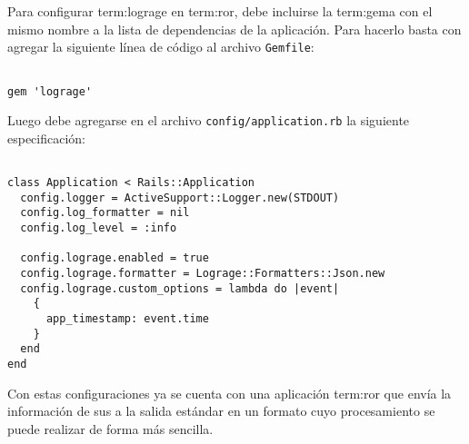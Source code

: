 Para configurar \gls{term:lograge} en \gls{term:ror}, debe incluirse la
\gls{term:gema} con el mismo nombre a la lista de dependencias de la aplicación.
Para hacerlo basta con agregar la siguiente línea de código al archivo
\texttt{Gemfile}:

\begin{lstlisting}

gem 'lograge'

\end{lstlisting}

Luego debe agregarse en el archivo \texttt{config/application.rb} la siguiente
especificación:

\begin{lstlisting}

class Application < Rails::Application
  config.logger = ActiveSupport::Logger.new(STDOUT)
  config.log_formatter = nil
  config.log_level = :info

  config.lograge.enabled = true
  config.lograge.formatter = Lograge::Formatters::Json.new
  config.lograge.custom_options = lambda do |event|
    {
      app_timestamp: event.time
    }
  end
end

\end{lstlisting}

Con estas configuraciones ya se cuenta con una aplicación \gls{term:ror} que
envía la información de sus  a la salida estándar en un formato cuyo
procesamiento se puede realizar de forma más sencilla.
